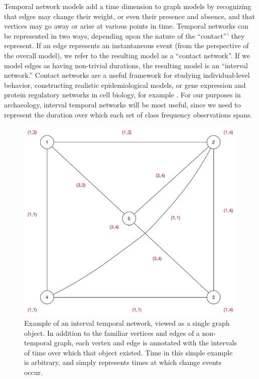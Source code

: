     Temporal network models add a time dimension to graph models by recognizing that edges may change their weight, or even their presence and absence, and that vertices may go away or arise at various points in time.  Temporal networks can be represented in two ways, depending upon the nature of the ``contact''' they represent.  If an edge represents an instantaneous event (from the perspective of the overall model), we refer to the resulting model as a ``contact network''.  If we model edges as having non-trivial durations, the resulting model is an ``interval network.''  Contact networks are a useful framework for studying individual-level behavior, constructing realistic epidemiological models, or gene expression and protein regulatory networks in cell biology, for example \citep{Holme2012}.  For our purposes in archaeology, interval temporal networks will be most useful, since we need to represent the duration over which each set of class frequency observations spans.  
    
    \begin{figure}[ht]
    \centering
    \includegraphics[scale=0.50]{graphics/multipleseriation/interval-temporal-network-single-view.pdf}
    \caption{Example of an interval temporal network, viewed as a single graph object.  In addition to the familiar vertices and edges of a non-temporal graph, each vertex and edge is annotated with the intervals of time over which that object existed.  Time in this simple example is arbitrary, and simply represents times at which change events occur.}
    \label{metapop:fig:itn-single-example}
    \end{figure}
    

